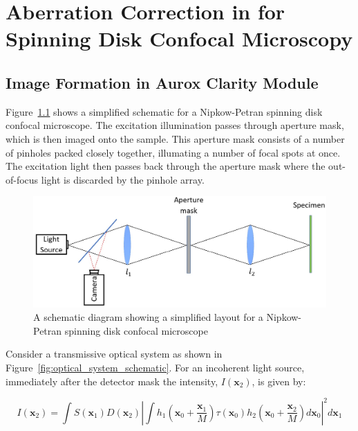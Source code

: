 \chapter{Aberration Correction in for Spinning Disk Confocal Microscopy}
\label{chpt:Aurox}

\section{Image Formation in Aurox Clarity Module}
\label{sec:Aurox_image_formation}

Figure~\ref{fig:confocal_schematic} shows a simplified schematic 
for a Nipkow-Petran spinning disk confocal microscope. The 
excitation illumination passes through aperture mask, which is 
then imaged onto the sample. This aperture mask consists of a 
number of pinholes packed closely together, illumating a number 
of focal spots at once. The excitation light then passes back 
through the aperture mask where the out-of-focus light is 
discarded by the pinhole array.\cite{egger1967new,fuseler2018types}

\begin{figure}[h]
	\centering
	\includegraphics[width=\textwidth]{images/confocal_schematic.jpg}
	\caption{A schematic diagram showing a simplified layout for a Nipkow-Petran spinning disk confocal microscope}
	\label{fig:confocal_schematic}
\end{figure}

Consider a transmissive optical system as shown in 
Figure~\ref{fig:optical_system_schematic}. For an incoherent 
light source, immediately after the detector mask the 
intensity, $I\left(\textbf{x}_{2}\right)$, is given by:

\begin{equation}\label{eq:intensity_after_detector}
	I\left(\textbf{x}_{2}\right) = \int S\left(\textbf{x}_{1}\right) D\left(\textbf{x}_{2}\right) \left| \int h_{1}\left(\textbf{x}_{0} + \frac{\textbf{x}_{1}}{M}\right) \tau\left(\textbf{x}_{0}\right) h_{2}\left(\textbf{x}_{0} + \frac{\textbf{x}_{2}}{M}\right)d\textbf{x}_{0}\right|^{2}d\textbf{x}_{1}
\end{equation}

